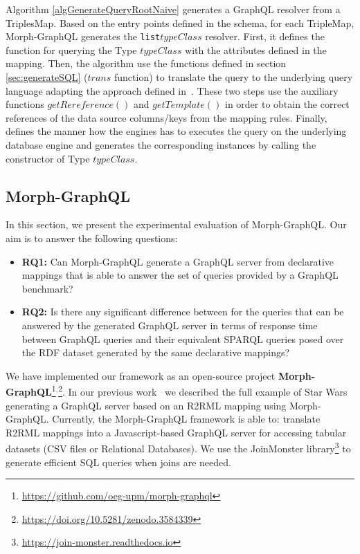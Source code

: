 Algorithm \ref{algGenerateQueryRootNaive} generates a GraphQL resolver from a TriplesMap. Based on the entry points defined in the schema, for each TripleMap, Morph-GraphQL generates the \texttt{list$typeClass$} resolver. First, it defines the function for querying the Type $typeClass$ with the attributes defined in the mapping. Then, the algorithm use the functions defined in section \ref{sec:generateSQL} ($trans$ function) to translate the query to the underlying query language adapting the approach defined in~\citep{chebotko2009semantics}. These two steps use the auxiliary functions $getRereference()$ and $getTemplate()$ in order to obtain the correct references of the data source columns/keys from the mapping rules. Finally, defines the manner how the engines has to executes the query on the underlying database engine and generates the corresponding instances by calling the constructor of Type $typeClass$.




\subsection{Morph-GraphQL}
In this section, we present the experimental evaluation of Morph-GraphQL. Our aim is to answer the following questions:
\begin{itemize}
    \item \textbf{RQ1:} Can Morph-GraphQL generate a GraphQL server from declarative mappings that is able to answer the set of queries provided by a GraphQL benchmark?
    \item \textbf{RQ2:} Is there any significant difference between for the queries that can be answered by the generated GraphQL server in terms of response time between GraphQL queries and their equivalent SPARQL queries posed over the RDF dataset generated by the same declarative mappings?
\end{itemize}

We have implemented our framework as an open-source project \textbf{Morph-GraphQL}\footnote{\url{https://github.com/oeg-upm/morph-graphql}}$^,$\footnote{\url{https://doi.org/10.5281/zenodo.3584339}}. In our previous work~\citep{priyatna2019morph} we described the full example of Star Wars generating a GraphQL server based on an R2RML mapping using Morph-GraphQL. Currently, the Morph-GraphQL framework is able to: translate R2RML mappings into a Javascript-based GraphQL server for accessing tabular datasets (CSV files or Relational Databases)\citep{priyatna2019morph}. We use the JoinMonster library\footnote{\url{https://join-monster.readthedocs.io}} to generate efficient SQL queries when joins are needed.


